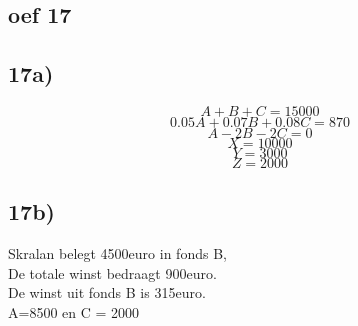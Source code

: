 \documentclass[10pt,a4paper]{article}
\begin{document}
\subsection*{oef 17}
\subsection*{17a)}
\[A + B + C = 15000\]
\[0.05A + 0.07B + 0.08C = 870\]
\[A-2B-2C=0\]
\[\]
\[X = 10000\]
\[Y = 3000\]
\[Z = 2000\]
\subsection*{17b)}
Skralan belegt 4500euro in fonds B, \\
De totale winst bedraagt 900euro. \\
De winst uit fonds B is 315euro. \\
A=8500 en C = 2000
\end{document}
